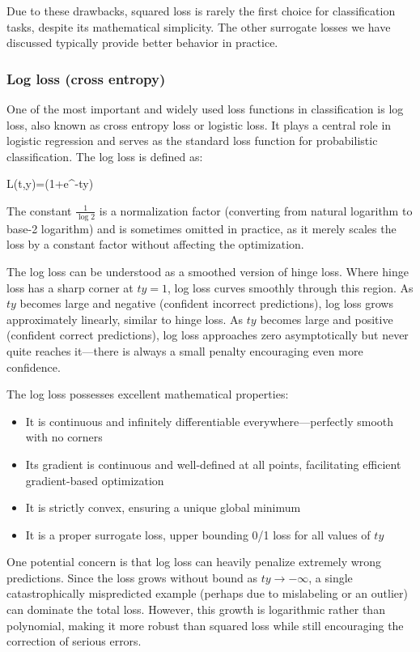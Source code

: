 Due to these drawbacks, squared loss is rarely the first choice for classification tasks, despite its mathematical simplicity. The other surrogate losses we have discussed typically provide better behavior in practice.

\subsubsection*{Log loss (cross entropy)}

One of the most important and widely used loss functions in classification is \alert{log loss}, also known as \alert{cross entropy loss} or \alert{logistic loss}. It plays a central role in logistic regression and serves as the standard loss function for probabilistic classification. The log loss is defined as:

\begin{myequation}
L(t,y)=\log (1+e^{-ty})
\end{myequation}

The constant $\frac{1}{\log 2}$ is a normalization factor (converting from natural logarithm to base-2 logarithm) and is sometimes omitted in practice, as it merely scales the loss by a constant factor without affecting the optimization.

The log loss can be understood as a smoothed version of hinge loss. Where hinge loss has a sharp corner at $ty = 1$, log loss curves smoothly through this region. As $ty$ becomes large and negative (confident incorrect predictions), log loss grows approximately linearly, similar to hinge loss. As $ty$ becomes large and positive (confident correct predictions), log loss approaches zero asymptotically but never quite reaches it—there is always a small penalty encouraging even more confidence.

The log loss possesses excellent mathematical properties:
\begin{itemize} 
\item It is continuous and infinitely differentiable everywhere—perfectly smooth with no corners
\item Its gradient is continuous and well-defined at all points, facilitating efficient gradient-based optimization
\item It is strictly convex, ensuring a unique global minimum
\item It is a proper surrogate loss, upper bounding 0/1 loss for all values of $ty$
\end{itemize}

One potential concern is that log loss can heavily penalize extremely wrong predictions. Since the loss grows without bound as $ty \to -\infty$, a single catastrophically mispredicted example (perhaps due to mislabeling or an outlier) can dominate the total loss. However, this growth is logarithmic rather than polynomial, making it more robust than squared loss while still encouraging the correction of serious errors.

